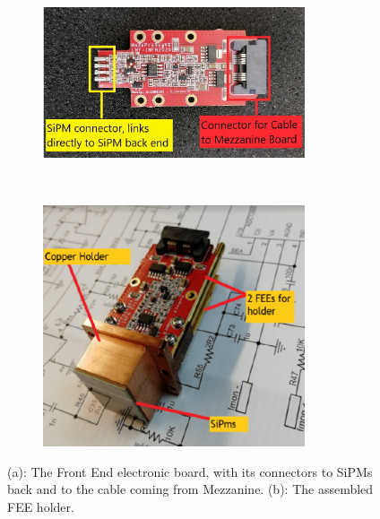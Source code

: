\begin{figure}[!h]
    \centering
    \begin{subfigure}[t]{0.5\textwidth}
        \centering
        \includegraphics[width=0.85\textwidth]{figures/png/Screenshot_20240706_143204.png}
        \caption{}
        \label{fig:connectiontomezzanine}
    \end{subfigure}%
    ~ 
    \begin{subfigure}[t]{0.5\textwidth}
        \centering
        \includegraphics[width=0.85\textwidth]{figures/png/Screenshot_20240706_143517.png}
        \caption{}
        \label{fig:holder}
    \end{subfigure}
   \caption{(a): The Front End electronic board, with its connectors to SiPMs 
   back and to the cable coming from Mezzanine. 
   (b): The assembled FEE holder.}
    \label{fig:calooo}
  \end{figure}


